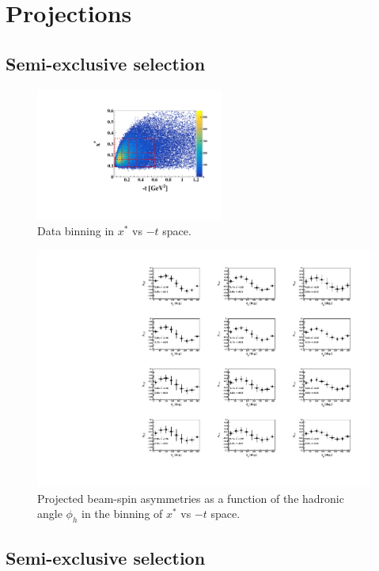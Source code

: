 \section{Projections}
\subsection{Semi-exclusive selection}


\begin{figure}[htb]
  \centering
    \includegraphics[width=0.55\textwidth,clip]{figs/pdf/t_x*.pdf}
  \caption{Data binning in $x^{*}$ vs $-t$ space.
   \label{fig:binning_x_t}}
\end{figure}

\begin{figure}[htb]
  \centering
    \includegraphics[width=1.1\textwidth,clip]{figs/pdf/BSA_incoherent_Phi_x_t.pdf}
  \caption{Projected beam-spin asymmetries as a function of the hadronic angle 
   $\phi_h$ in the binning of $x^{*}$ vs $-t$ space.
   \label{fig:alu_semi}}
\end{figure}




\subsection{Semi-exclusive selection}

